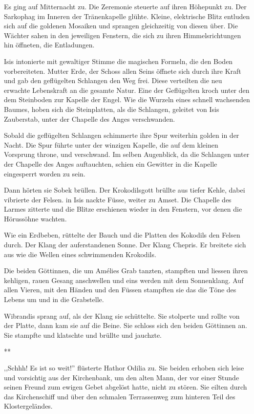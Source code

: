 \documentclass[11pt,titlepage,a5paper]{book}
\newcommand{\sterne}{\par{\centering ***\par}}
\begin{document}
Es ging auf Mitternacht zu. Die Zeremonie steuerte auf ihren Höhepunkt zu. Der Sarkophag im Inneren der Tränenkapelle glühte. Kleine, elektrische Blitz entluden sich auf die goldenen Mosaiken und sprangen gleichzeitig von diesen über. Die Wächter sahen in den jeweiligen Fenstern, die sich zu ihren Himmelsrichtungen hin öffneten, die Entladungen.

Isis intonierte mit gewaltiger Stimme die magischen Formeln, die den Boden vorbereiteten. Mutter Erde, der Schoss allen Seins öffnete sich durch ihre Kraft und gab den geflügelten Schlangen den Weg frei. Diese verteilten die neu erwachte Lebenskraft an die gesamte Natur. Eine der Geflügelten kroch unter den dem Steinboden zur Kapelle der Engel. Wie die Wurzeln eines schnell wachsenden Baumes, hoben sich die Steinplatten, als die Schlangen, geleitet von Isis Zauberstab, unter der Chapelle des Anges verschwanden.

Sobald die geflügelten Schlangen schimmerte ihre Spur weiterhin golden in der Nacht. Die Spur führte unter der winzigen Kapelle, die auf dem kleinen Vorsprung throne, und verschwand. Im selben Augenblick, da die Schlangen unter der Chapelle des Anges auftauchten, schien ein Gewitter in die Kapelle eingesperrt worden zu sein. 

Dann hörten sie Sobek brüllen. Der Krokodilsgott brüllte aus tiefer Kehle, dabei vibrierte der Felsen. in Isis nackte Füsse, weiter zu Amset. Die Chapelle des Larmes zitterte und die Blitze erschienen wieder in den Fenstern, vor denen die Hörussöhne wachten. 

Wie ein Erdbeben, rüttelte der Bauch und die Platten des Kokodils den Felsen durch. Der Klang der auferstandenen Sonne. Der Klang Chepris. Er breitete sich aus wie die Wellen eines schwimmenden Krokodils.

Die beiden Göttinnen, die um Amélies Grab tanzten, stampften und liessen ihren kehligen, rauen Gesang anschwellen und eins werden mit dem Sonnenklang. Auf allen Vieren, mit den Händen und den Füssen stampften sie das die Töne des Lebens um und in die Grabstelle.

Wibrandis sprang auf, als der Klang sie schüttelte. Sie stolperte und rollte von der Platte, dann kam sie auf die Beine. Sie schloss sich den beiden Göttinnen an. Sie stampfte und klatschte und brüllte und jauchzte. 

\sterne

,,Schhh! Es ist so weit!'' flüsterte Hathor Odilia zu. Sie beiden erhoben sich leise und vorsichtig aus der Kirchenbank, um den alten Mann, der vor einer Stunde seinen Freund zum ewigen Gebet abgelöst hatte, nicht zu stören.
 Sie eilten durch das Kirchenschiff und über den schmalen Terrassenweg zum hinteren Teil des Klostergeländes. 
 
\end{document}
